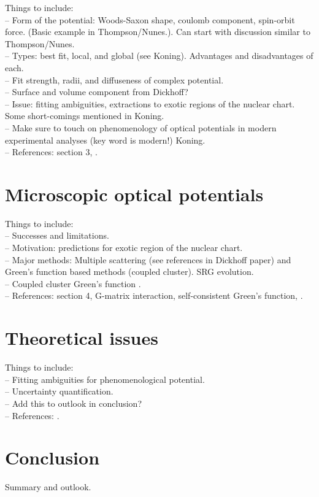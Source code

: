 \documentclass[preprintnumbers,floatfix,aps,prc,preprint,nofootinbib]{revtex4-1}
\begin{document}
Things to include:
\\
-- Form of the potential: Woods-Saxon shape, coulomb component, spin-orbit force. (Basic example in Thompson/Nunes.). Can start with discussion similar to Thompson/Nunes.
\\
-- Types: best fit, local, and global (see Koning). Advantages and disadvantages of each.
\\
-- Fit strength, radii, and diffuseness of complex potential.
\\
-- Surface and volume component from Dickhoff?
\\
-- Issue: fitting ambiguities, extractions to exotic regions of the nuclear chart. Some short-comings mentioned in Koning.
\\
-- Make sure to touch on phenomenology of optical potentials in modern experimental analyses (key word is modern!) Koning.
\\
-- References: \cite{Dickhoff:2018wdd} section 3, \cite{Koning:2003zz}.



\section{Microscopic optical potentials}
\label{sec:microscopic}


Things to include:
\\
-- Successes and limitations.
\\
-- Motivation: predictions for exotic region of the nuclear chart.
\\
-- Major methods: Multiple scattering (see references in Dickhoff paper) and Green's function based methods (coupled cluster). SRG evolution.
\\
-- Coupled cluster Green's function \cite{Rotureau:2016jpf}.
\\
-- References: \cite{Dickhoff:2018wdd} section 4, \cite{Furumoto:2019anr} G-matrix interaction, \cite{Idini:2019hkq} self-consistent Green's function, \cite{Rotureau:2016jpf}.


\section{Theoretical issues}
\label{sec:section_4}


Things to include:
\\
-- Fitting ambiguities for phenomenological potential.
\\
-- Uncertainty quantification.
\\
-- Add this to outlook in conclusion?
\\
-- References: \cite{King:2018vzw}.


\section{Conclusion}
\label{sec:conclusion}


Summary and outlook.





\end{document}
